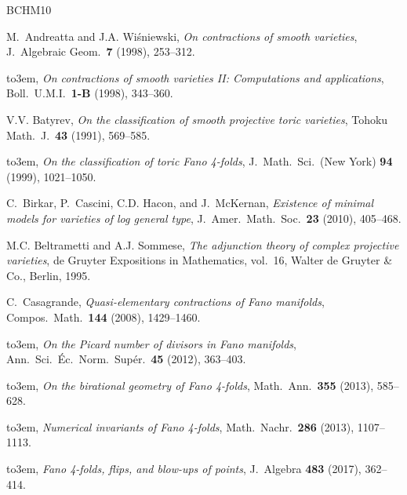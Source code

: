 \documentclass[a4paper,12pt]{amsart}
\theoremstyle{definition}
\numberwithin{figure}{section}
\numberwithin{table}{section}
\begin{document}
\providecommand{\noop}[1]{}
\providecommand{\bysame}{\leavevmode\hbox to3em{\hrulefill}\thinspace}
\providecommand{\MR}{\relax\ifhmode\unskip\space\fi MR }
\providecommand{\MRhref}[2]{%
  \href{http://www.ams.org/mathscinet-getitem?mr=#1}{#2}
}
\providecommand{\href}[2]{#2}
\begin{thebibliography}{BCHM10}

M.~Andreatta and J.A. Wi{\'s}niewski, \emph{On contractions of smooth
  varieties}, J.\ Algebraic Geom.\ \textbf{7} (1998), 253--312.

\bysame, \emph{On contractions of smooth varieties {II}: Computations and
  applications}, Boll.\ U.M.I.\ \textbf{1-B} (1998), 343--360.

V.V. Batyrev, \emph{On the classification of smooth projective toric
  varieties}, Tohoku Math.\ J.\ \textbf{43} (1991), 569--585.

\bysame, \emph{On the classification of toric {F}ano 4-folds}, J.\ Math.\ Sci.\
  (New York) \textbf{94} (1999), 1021--1050.

C.~Birkar, P.~Cascini, C.D. Hacon, and J.~McKernan, \emph{Existence of minimal
  models for varieties of log general type}, J.\ Amer.\ Math.\ Soc.\
  \textbf{23} (2010), 405--468.

M.C. Beltrametti and A.J. Sommese, \emph{The adjunction theory of complex
  projective varieties}, de Gruyter Expositions in Mathematics, vol.~16, Walter
  de Gruyter \& Co., Berlin, 1995.

C.~Casagrande, \emph{Quasi-elementary contractions of {F}ano manifolds},
  Compos.\ Math.\ \textbf{144} (2008), 1429--1460.

\bysame, \emph{On the {P}icard number of divisors in {F}ano manifolds},
  Ann.~Sci.~{\'E}c.~Norm.~Sup{\'e}r.\ \textbf{45} (2012), 363--403.

\bibitem[Cas13a]{eff}
\bysame, \emph{\noop{aaa}{O}n the birational geometry of {F}ano 4-folds},
  Math.~Ann.\ \textbf{355} (2013), 585--628.

\bysame, \emph{\noop{zzz}{N}umerical invariants of {F}ano 4-folds},
  Math.~Nachr.\ \textbf{286} (2013), 1107--1113.

\bysame, \emph{{F}ano 4-folds, flips, and blow-ups of points}, J.~Algebra
  \textbf{483} (2017), 362--414.


\end{thebibliography}
\end{document}
